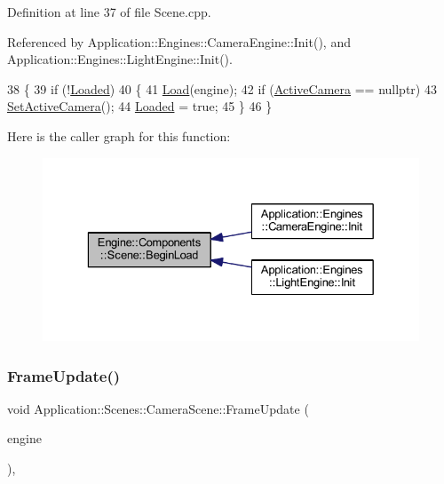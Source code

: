 Definition at line 37 of file Scene.\+cpp.



Referenced by Application\+::\+Engines\+::\+Camera\+Engine\+::\+Init(), and Application\+::\+Engines\+::\+Light\+Engine\+::\+Init().


\begin{DoxyCode}
38 \{
39     \textcolor{keywordflow}{if} (!\mbox{\hyperlink{classEngine_1_1Components_1_1Scene_ae828757eea5410550f6674421051a783}{Loaded}})
40     \{
41         \mbox{\hyperlink{classEngine_1_1Components_1_1Scene_a23c5b23e66646443670a487e7c016e73}{Load}}(engine);
42         \textcolor{keywordflow}{if} (\mbox{\hyperlink{classEngine_1_1Components_1_1Scene_a9408befee37d89e2c001d25b9e4ed75a}{ActiveCamera}} == \textcolor{keyword}{nullptr})
43             \mbox{\hyperlink{classEngine_1_1Components_1_1Scene_a936218df56c481f3aa12d684cee038f3}{SetActiveCamera}}();
44         \mbox{\hyperlink{classEngine_1_1Components_1_1Scene_ae828757eea5410550f6674421051a783}{Loaded}} = \textcolor{keyword}{true};
45     \}
46 \}
\end{DoxyCode}
Here is the caller graph for this function\+:
\nopagebreak
\begin{figure}[H]
\begin{center}
\leavevmode
\includegraphics[width=329pt]{classEngine_1_1Components_1_1Scene_af18bd334fe66952b8d79b8e9e99ab2d8_icgraph}
\end{center}
\end{figure}
\mbox{\label{classApplication_1_1Scenes_1_1CameraScene_a92eb1a3eab4de7d18ca108e4aefd7fc7}} 
\subsubsection{\texorpdfstring{Frame\+Update()}{FrameUpdate()}}
{\footnotesize\ttfamily void Application\+::\+Scenes\+::\+Camera\+Scene\+::\+Frame\+Update (\begin{DoxyParamCaption}\item[{\mbox{\hyperlink{classEngine_1_1BaseEngine}{Engine\+::\+Base\+Engine}} $\ast$}]{engine }\end{DoxyParamCaption})\hspace{0.3cm}{\ttfamily [override]}, {\ttfamily [virtual]}}



